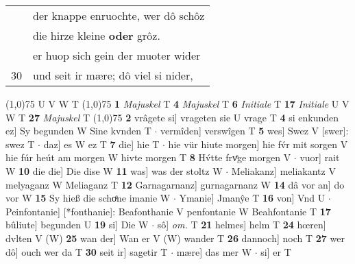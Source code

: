 \documentclass[8pt,a4paper,notitlepage]{article}
\begin{document}
\begin{table}[ht]
\begin{minipage}[t]{0.5\linewidth}
\begin{tabular}{rl}
 & der knappe enruochte, wer dô schôz\\ 
 & die hirze kleine \textbf{oder} grôz.\\ 
 & er huop sich gein der muoter wider\\ 
30 & und seit ir mære; dô viel si nider,\\ 
\end{tabular}
\scriptsize
\line(1,0){75} \newline
U V W T \newline
\line(1,0){75} \newline
\textbf{1} \textit{Majuskel} T  \textbf{4} \textit{Majuskel} T  \textbf{6} \textit{Initiale} T  \textbf{17} \textit{Initiale} U V W T  \textbf{27} \textit{Majuskel} T  \newline
\line(1,0){75} \newline
\textbf{2} vrâgete si] vrageten sie U vrage T \textbf{4} si enkunden ez] Sy begunden W Sine kvnden T  $\cdot$ vermîden] verswîgen T \textbf{5} wes] Swez V [swer]: swez T  $\cdot$ daz] es W ez T \textbf{7} die] hie T  $\cdot$ hie vür hiute morgen] hie fv́r mit sorgen V hie fúr heút am morgen W hivte morgen T \textbf{8} Hv́tte frvͤge morgen V  $\cdot$ vuor] rait W \textbf{10} die die] Die dise W \textbf{11} was] was der stoltz W  $\cdot$ Meliakanz] meliakantz V melyaganz W Meliaganz T \textbf{12} Garnagarnanz] gurnagarnanz W \textbf{14} dâ vor an] do vor W \textbf{15} Sy hieß die schoͤne imanie W  $\cdot$ Ymanie] Jmanŷe T \textbf{16} von] Vnd U  $\cdot$ Peinfontanie] [*fonthanie]: Beafonthanie V penfontanie W Beahfontanie T \textbf{17} bûliute] begunden U \textbf{19} si] Die W  $\cdot$ sô] \textit{om.} T \textbf{21} helmes] helm T \textbf{24} hœren] dvlten V (W) \textbf{25} wan der] Wan er V (W) wander T \textbf{26} dannoch] noch T \textbf{27} wer dô] ouch wer da T \textbf{30} seit ir] sagetir T  $\cdot$ mære] das mer W  $\cdot$ si] er T \newline
\end{minipage}
\end{table}
\end{document}

